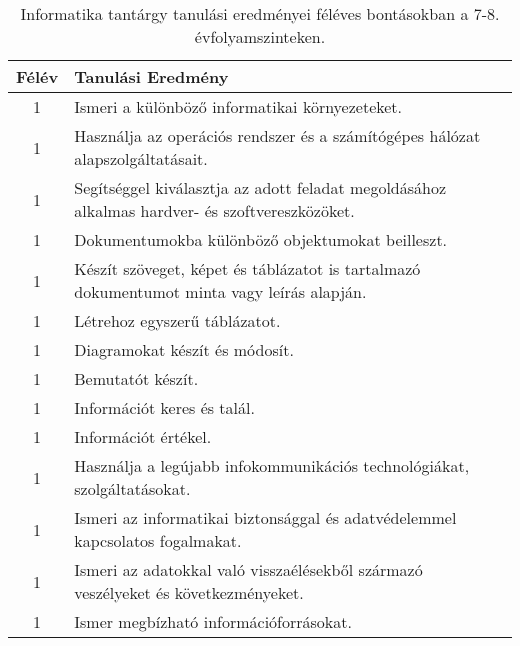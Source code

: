        
           \begin{longtable}{c | p{12cm} }
            \caption[Informatika 7-8.]{Informatika tantárgy tanulási eredményei féléves bontásokban a 7-8. évfolyamszinteken. }  \\

            \textbf{Félév} & \textbf{Tanulási Eredmény} \\
            \hline
            \endhead
                                
                                          1 &  Ismeri a különböző informatikai környezeteket. \\ \hline
                                          1 &  Használja az operációs rendszer és a számítógépes hálózat alapszolgáltatásait. \\ \hline
                                          1 &  Segítséggel kiválasztja az adott feladat megoldásához alkalmas hardver- és szoftvereszközöket. \\ \hline
                                          1 &  Dokumentumokba különböző objektumokat beilleszt. \\ \hline
                                          1 &  Készít szöveget, képet és táblázatot is tartalmazó dokumentumot minta vagy leírás alapján. \\ \hline
                                          1 &  Létrehoz egyszerű táblázatot. \\ \hline
                                          1 &  Diagramokat készít és módosít. \\ \hline
                                          1 &  Bemutatót készít. \\ \hline
                                          1 &  Információt keres és talál. \\ \hline
                                          1 &  Információt értékel. \\ \hline
                                          1 &  Használja a legújabb infokommunikációs technológiákat, szolgáltatásokat. \\ \hline
                                          1 &  Ismeri az informatikai biztonsággal és adatvédelemmel kapcsolatos fogalmakat. \\ \hline
                                          1 &  Ismeri az adatokkal való visszaélésekből származó veszélyeket és következményeket. \\ \hline
                                          1 &  Ismer megbízható információforrásokat. \\ \hline

\end{longtable}

